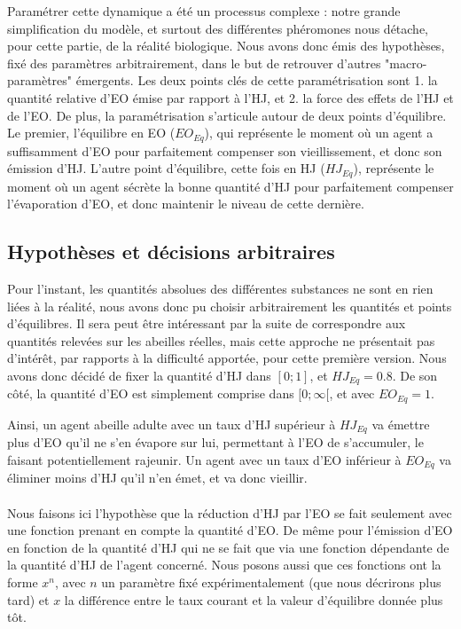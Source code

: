 	Paramétrer cette dynamique a été un processus complexe : notre grande simplification du modèle, et surtout des différentes phéromones nous détache, pour cette partie, de la réalité biologique. Nous avons donc émis des hypothèses, fixé des paramètres arbitrairement, dans le but de retrouver d'autres "macro-paramètres" émergents. Les deux points clés de cette paramétrisation sont 1. la quantité relative d'EO émise par rapport à l'HJ, et 2. la force des effets de l'HJ et de l'EO. De plus, la paramétrisation s'articule autour de deux points d'équilibre. Le premier, l'équilibre en EO ($EO_{Eq}$), qui représente le moment où un agent a suffisamment d'EO pour parfaitement compenser son vieillissement, et donc son émission d'HJ. L'autre point d'équilibre, cette fois en HJ ($HJ_{Eq}$), représente le moment où un agent sécrète la bonne quantité d'HJ pour parfaitement compenser l'évaporation d'EO, et donc maintenir le niveau de cette dernière.
	
	\subsection{Hypothèses et décisions arbitraires}
	Pour l'instant, les quantités absolues des différentes substances ne sont en rien liées à la réalité, nous avons donc pu choisir arbitrairement les quantités et points d'équilibres. Il sera peut être intéressant par la suite de correspondre aux quantités relevées sur les abeilles réelles, mais cette approche ne présentait pas d'intérêt, par rapports à la difficulté apportée, pour cette première version. Nous avons donc décidé de fixer la quantité d'HJ dans $[0;1]$, et $HJ_{Eq} = 0.8$. De son côté, la quantité d'EO est simplement comprise dans $[0;\infty[$, et avec $EO_{Eq} = 1$. 
	
	Ainsi, un agent abeille adulte avec un taux d'HJ supérieur à $HJ_{Eq}$ va émettre plus d'EO qu'il ne s'en évapore sur lui, permettant à l'EO de s'accumuler, le faisant potentiellement rajeunir. Un agent avec un taux d'EO inférieur à $EO_{Eq}$ va éliminer moins d'HJ qu'il n'en émet, et va donc vieillir.
	
	\paragraph{}
	Nous faisons ici l'hypothèse que la réduction d'HJ par l'EO se fait seulement avec une fonction prenant en compte la quantité d'EO. De même pour l'émission d'EO en fonction de la quantité d'HJ qui ne se fait que via une fonction dépendante de la quantité d'HJ de l'agent concerné. Nous posons aussi que ces fonctions ont la forme $x^n$, avec $n$ un paramètre fixé expérimentalement (que nous décrirons plus tard) et $x$ la différence entre le taux courant et la valeur d'équilibre donnée plus tôt.
	
